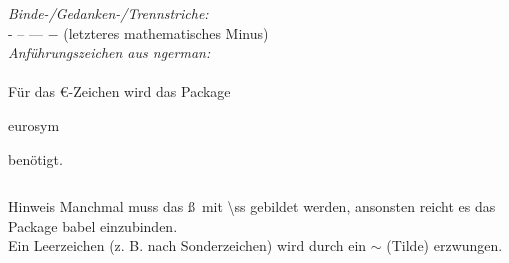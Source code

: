 \begin{frame}
\begin{columns}
\begin{column}{0.5\textwidth}
\textit{Binde-\slash Gedanken-\slash Trennstriche:} \\
- -- --- $-$ (letzteres mathematisches Minus) \\

\textit{Anführungszeichen aus ngerman:} \\
\glqq \grqq \flqq \frqq\\[5mm]
Für das \euro -Zeichen wird das Package \begin{ttfamily}eurosym\end{ttfamily}
benötigt.\\

\end{column}
\end{columns}

\begin{block}{Hinweis}
\footnotesize Manchmal muss das \ss ~mit \color{nounibaredI} \textbackslash ss \color{black}gebildet werden, ansonsten reicht es das Package {\ttfamily babel} einzubinden.\\
Ein Leerzeichen (z. B. nach Sonderzeichen) wird durch ein \color{nounibaredI} $\sim$ \color{black} (Tilde) erzwungen.
\end{block}
\vspace{-8mm}

\end{frame}


